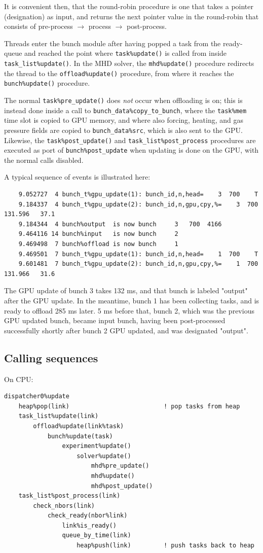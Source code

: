 \documentclass[paper=a4,fontsize=11pt]{scrartcl}
\numberwithin{equation}{section}		%
\numberwithin{figure}{section}			%
\numberwithin{table}{section}				%
\newcommand{\codecolor}{\color{Blue}}
\begin{document}
It is convenient then, that the round-robin procedure is one that takes a pointer (designation) as input, and returns the next pointer value in the round-robin that consists of pre-process $\rightarrow$ process $\rightarrow$ post-process.

Threads enter the bunch module after having popped a task from the ready-queue and reached the point where \verb|task%update()| is called from inside \verb|task_list%update()|.  In the MHD solver, the \verb|mhd%update()| procedure redirects the thread to the \verb|offload%update()| procedure, from where it reaches the \verb|bunch%update()| procedure.  

The normal \verb|task%pre_update()| does \textit{not} occur when offloading is on; this is instead done inside a call to \verb|bunch_data%copy_to_bunch|, where the \verb|task%mem| time slot is copied to GPU memory, and where also forcing, heating, and gas pressure fields are copied to \verb|bunch_data%src|, which is also sent to the GPU.  Likewise, the \verb|task%post_update()| and \verb|task_list%post_process| procedures are executed as port of \verb|bunch%post_update| when updating is done on the GPU, with the normal calls disabled. 

A typical sequence of events is illustrated here:
{\small\codecolor\begin{verbatim}
    9.052727  4 bunch_t%gpu_update(1): bunch_id,n,head=    3  700    T
    9.184337  4 bunch_t%gpu_update(2): bunch_id,n,gpu,cpy,%=    3  700  131.596   37.1
    9.184344  4 bunch%output  is now bunch     3   700  4166
    9.464116 14 bunch%input   is now bunch     2
    9.469498  7 bunch%offload is now bunch     1
    9.469501  7 bunch_t%gpu_update(1): bunch_id,n,head=    1  700    T
    9.601481  7 bunch_t%gpu_update(2): bunch_id,n,gpu,cpy,%=    1  700  131.966   31.6
\end{verbatim}}
The GPU update of bunch 3 takes 132 ms, and that bunch is labeled "output" after the GPU update.   In the meantime, bunch 1 has been collecting tasks, and is ready to offload 285 ms later.  5 ms before that, bunch 2, which was the previous GPU updated bunch, became input bunch, having been post-processed successfully shortly after bunch 2 GPU updated, and was designated "output".

\subsection{Calling sequences}
On CPU:
{\small\codecolor\begin{verbatim}
dispatcher0%update
    heap%pop(link)                          ! pop tasks from heap
    task_list%update(link)
        offload%update(link%task)
            bunch%update(task)
                experiment%update()
                    solver%update()
                        mhd%pre_update()
                        mhd%update()
                        mhd%post_update()
    task_list%post_process(link)
        check_nbors(link)
            check_ready(nbor%link)
                link%is_ready()
                queue_by_time(link)
                    heap%push(link)         ! push tasks back to heap
\end{verbatim}}
\end{document}

